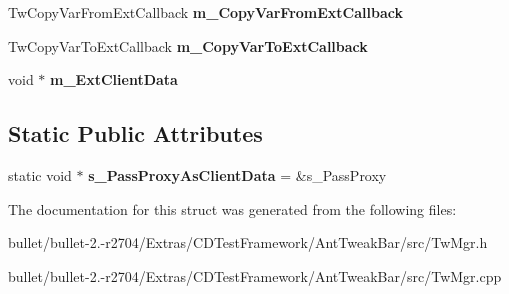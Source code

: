 \begin{DoxyCompactItemize}
\item 
\hypertarget{struct_c_tw_mgr_1_1_c_struct_a0444a8fbc2ec8ecc91bf05e9432fa6a8}{Tw\+Copy\+Var\+From\+Ext\+Callback {\bfseries m\+\_\+\+Copy\+Var\+From\+Ext\+Callback}}\label{struct_c_tw_mgr_1_1_c_struct_a0444a8fbc2ec8ecc91bf05e9432fa6a8}

\item 
\hypertarget{struct_c_tw_mgr_1_1_c_struct_a44cedeed9e32e7135153728363341f66}{Tw\+Copy\+Var\+To\+Ext\+Callback {\bfseries m\+\_\+\+Copy\+Var\+To\+Ext\+Callback}}\label{struct_c_tw_mgr_1_1_c_struct_a44cedeed9e32e7135153728363341f66}

\item 
\hypertarget{struct_c_tw_mgr_1_1_c_struct_ab35025b7d6cbf929eacc0ee40269194c}{void $\ast$ {\bfseries m\+\_\+\+Ext\+Client\+Data}}\label{struct_c_tw_mgr_1_1_c_struct_ab35025b7d6cbf929eacc0ee40269194c}

\end{DoxyCompactItemize}
\subsection*{Static Public Attributes}
\begin{DoxyCompactItemize}
\item 
\hypertarget{struct_c_tw_mgr_1_1_c_struct_af88f6d63318a47320e038c41a8090478}{static void $\ast$ {\bfseries s\+\_\+\+Pass\+Proxy\+As\+Client\+Data} = \&s\+\_\+\+Pass\+Proxy}\label{struct_c_tw_mgr_1_1_c_struct_af88f6d63318a47320e038c41a8090478}

\end{DoxyCompactItemize}


The documentation for this struct was generated from the following files\+:\begin{DoxyCompactItemize}
\item 
bullet/bullet-\/2.-\/r2704/\+Extras/\+C\+D\+Test\+Framework/\+Ant\+Tweak\+Bar/src/Tw\+Mgr.\+h\item 
bullet/bullet-\/2.-\/r2704/\+Extras/\+C\+D\+Test\+Framework/\+Ant\+Tweak\+Bar/src/Tw\+Mgr.\+cpp\end{DoxyCompactItemize}
